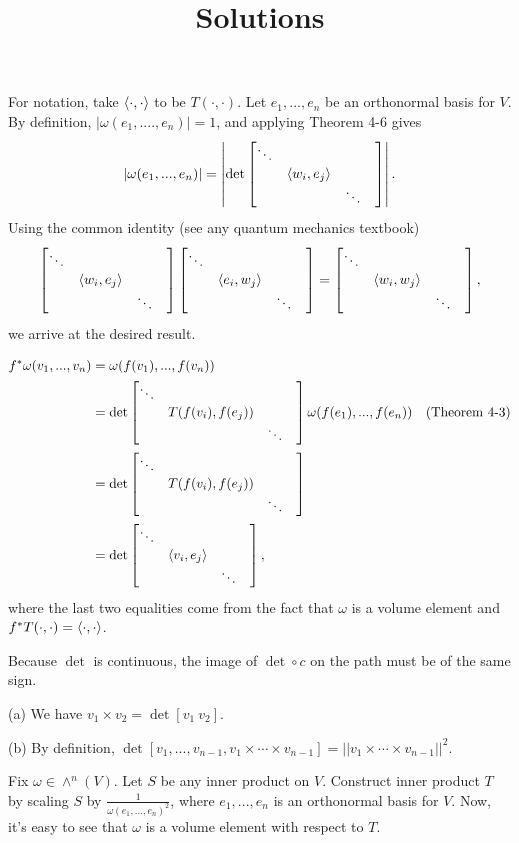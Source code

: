 \documentclass[11pt]{scrartcl}
\begin{document}
\title{Solutions}

\maketitle

\begin{problem*}[4-3]
\end{problem*}

For notation, take $\langle \cdot, \cdot \rangle$ to be $T(\cdot, \cdot)$.
Let $e_1, ..., e_n$ be an orthonormal basis for $V$.
By definition, $|\omega(e_1, ...., e_n)| = 1$, and applying Theorem 4-6 gives 
$$|\omega(e_1, ..., e_n)| = \left|\det\begin{bmatrix} \ddots & & & \\ & \langle w_i, e_j \rangle & & \\ & & \ddots \end{bmatrix}\right|.$$
Using the common identity (see any quantum mechanics textbook)
$$\begin{bmatrix} \ddots & & & \\ & \langle w_i, e_j \rangle & & \\ & & \ddots \end{bmatrix}\begin{bmatrix} \ddots & & & \\ & \langle e_i, w_j \rangle & & \\ & & \ddots \end{bmatrix} = \begin{bmatrix} \ddots & & & \\ & \langle w_i, w_j \rangle & & \\ & & \ddots \end{bmatrix},$$ 
we arrive at the desired result.

\begin{problem*}[4-4]
\end{problem*}

\begin{align*}
    f^*\omega(v_1, ..., v_n) 
    &= 
    \omega(f(v_1), ..., f(v_n)) \\
    &=
    \det\begin{bmatrix} \ddots & & & \\ & T(f(v_i), f(e_j)) & & \\ & & \ddots \end{bmatrix}\omega(f(e_1), ..., f(e_n)) &\text{(Theorem 4-3)} \\
    &=
    \det\begin{bmatrix} \ddots & & & \\ & T(f(v_i), f(e_j)) & & \\ & & \ddots \end{bmatrix}\\
    &= 
    \det\begin{bmatrix} \ddots & & & \\ & \langle v_i, e_j \rangle & & \\ & & \ddots \end{bmatrix},
\end{align*}
where the last two equalities come from the fact that $\omega$ is a volume element and $f^*T(\cdot, \cdot) = \langle \cdot, \cdot \rangle$.

\begin{problem*}[4-5]
\end{problem*}
Because $\det$ is continuous, the image of $\det\circ c$ on the path must be of the same sign.

\begin{problem*}[4-6]
\end{problem*}
(a) We have $v_1\times v_2 = \det[v_1\ v_2]$.

(b) By definition, $\det[v_1, ..., v_{n - 1}, v_1\times\cdots \times v_{n - 1}] = ||v_1\times\cdots \times v_{n - 1}||^2$.

\begin{problem*}[4-7]
\end{problem*}
Fix $\omega\in \wedge^n(V)$.
Let $S$ be any inner product on $V$.
Construct inner product $T$ by scaling $S$ by $\frac{1}{\omega(e_1, ..., e_n)^2}$, 
where $e_1, ..., e_n$ is an orthonormal basis for $V$.
Now, it's easy to see that $\omega$ is a volume element with respect to $T$.
\end{document}
